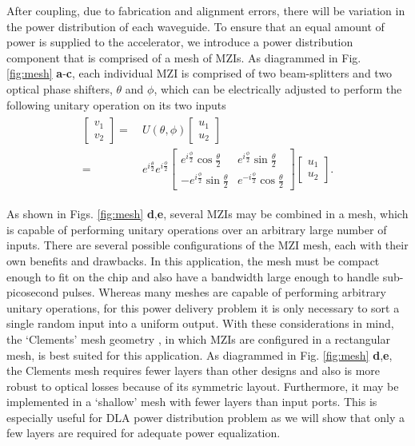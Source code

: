 \begin{figure}
\end{figure}

After coupling, due to fabrication and alignment errors, there will be variation in the power distribution of each waveguide. To ensure that an equal amount of power is supplied to the accelerator, we introduce a power distribution component that is comprised of a mesh of MZIs.  As diagrammed in Fig. \ref{fig:mesh} \textbf{a}-\textbf{c}, each individual MZI is comprised of two beam-splitters and two optical phase shifters, $\theta$ and $\phi$, which can be electrically adjusted to perform the following unitary operation on its two inputs \cite{reck_experimental_1994,Clements2016,shen2017deep,pai2018matrix}
\begin{align}
\begin{split}
    \begin{bmatrix}
      v_1 \\ v_2
    \end{bmatrix}
    =&~U(\theta, \phi) 
    \begin{bmatrix}
      u_1 \\ u_2
    \end{bmatrix}
    \\
    =&~e^{i\frac{\theta}{2}} e^{i\frac{\phi}{2}}
    \begin{bmatrix}
      e^{i\frac{\phi}{2}}\cos{\frac{\theta}{2}} &
      e^{i\frac{\phi}{2}}\sin{\frac{\theta}{2}} \\
      - e^{i\frac{\phi}{2}}\sin{\frac{\theta}{2}} & 
      e^{-i\frac{\phi}{2}}\cos{\frac{\theta}{2}}
    \end{bmatrix}
    \begin{bmatrix}
      u_1 \\ u_2
    \end{bmatrix}.
\end{split}
\label{eq:U}
\end{align}
%

As shown in Figs. \ref{fig:mesh} \textbf{d},\textbf{e}, several MZIs may be combined in a mesh, which is capable of performing unitary operations over an arbitrary large number of inputs.  There are several possible configurations of the MZI mesh, each with their own benefits and drawbacks.  In this application, the mesh must be compact enough to fit on the chip and also have a bandwidth large enough to handle sub-picosecond pulses.  Whereas many meshes are capable of performing arbitrary unitary operations, for this power delivery problem it is only necessary to sort a single random input into a uniform output.  With these considerations in mind, the `Clements' mesh geometry \cite{Clements2016}, in which MZIs are configured in a rectangular mesh, is best suited for this application.   As diagrammed in Fig. \ref{fig:mesh} \textbf{d},\textbf{e}, the Clements mesh requires fewer layers than other designs \cite{reck_experimental_1994} and also is more robust to optical losses because of its symmetric layout.  Furthermore, it may be implemented in a `shallow' mesh with fewer layers than input ports.  This is especially useful for DLA power distribution problem as we will show that only a few layers are required for adequate power equalization.  %

